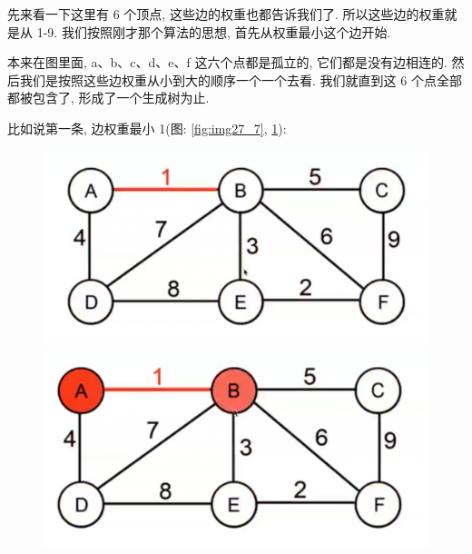 先来看一下这里有 6 个顶点, 这些边的权重也都告诉我们了. 所以这些边的权重就是从 1-9. 我们按照刚才那个算法的思想, 首先从权重最小这个边开始. 

本来在图里面, a、b、c、d、e、f 这六个点都是孤立的, 它们都是没有边相连的. 然后我们是按照这些边权重从小到大的顺序一个一个去看. 我们就直到这 6 个点全部都被包含了, 形成了一个生成树为止. 

比如说第一条, 边权重最小 1(图: \ref{fig:img27_7}, \ref{fig:img27_8}):

\begin{figure}[ht]
  \centering
  \begin{minipage}[t]{0.4\textwidth}
    \centering
    \caption{}
    \label{fig:img27_7}
    \includegraphics[width=\textwidth]{asset/aefaaf0e-21e1-4505-aff2-907f9932b2b3.jpg}
  \end{minipage}%
  \hspace{1em}
  \begin{minipage}[t]{0.4\textwidth}
    \centering
    \caption{}
    \label{fig:img27_8}
    \includegraphics[width=\textwidth]{asset/9d0be540-499d-4d9b-9b9b-d3ed959381cf.jpg}
  \end{minipage}
\end{figure}

